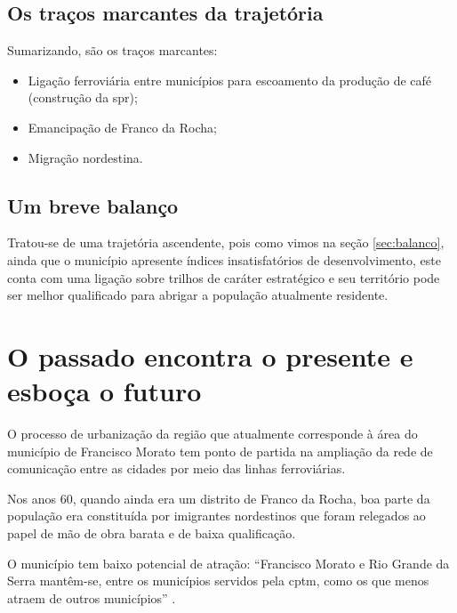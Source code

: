 	\section{Os traços marcantes da trajetória} \label{sec:tracos-sumario}
	
	Sumarizando, são os traços marcantes:
	
	\begin{itemize}
		\item Ligação ferroviária entre municípios para escoamento da produção de café (construção da \gls{spr});
		\item Emancipação de Franco da Rocha;
		\item Migração nordestina.
	\end{itemize}
	
	\section{Um breve balanço}
		
	Tratou-se de uma trajetória ascendente, pois como vimos na seção \ref{sec:balanco}, ainda que o município apresente índices insatisfatórios de desenvolvimento, este conta com uma ligação sobre trilhos de caráter estratégico e seu território pode ser melhor qualificado para abrigar a população atualmente residente.
	
	\chapter{O passado encontra o presente e esboça o futuro}
	
	O processo de urbanização da região que atualmente corresponde à área do município de Francisco Morato tem ponto de partida na ampliação da rede de comunicação entre as cidades por meio das linhas ferroviárias.
	
	Nos anos 60, quando ainda era um distrito de Franco da Rocha, boa parte da população era constituída por imigrantes nordestinos que foram relegados ao papel de mão de obra barata e de baixa qualificação.
	
	O município tem baixo potencial de atração: ``Francisco Morato e Rio Grande da Serra mantêm-se, entre os municípios servidos pela \gls{cptm}, como os que menos atraem de outros municípios'' \cite[p.80]{ferreira2010a}.
	
